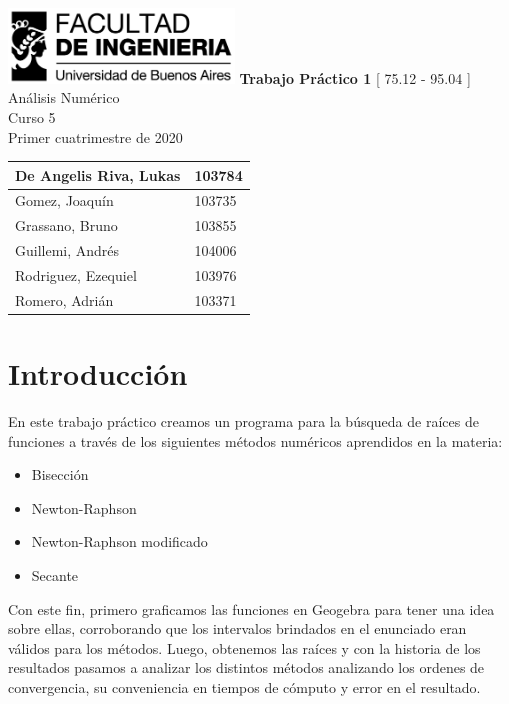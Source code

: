 \documentclass[titlepage,a4paper]{article}
\begin{document}
\begin{titlepage} %
	\hfill\includegraphics[width=6cm]{logofiuba.jpg}
    \centering
    \vfill
    \Huge \textbf{Trabajo Práctico 1}
    \vskip2cm
    \Large [ 75.12 - 95.04 ] Análisis Numérico\\
    Curso 5 \\ 
    Primer cuatrimestre de 2020\\
    \vfill
    \begin{tabular}{ | l | l | } %
      \hline
        De Angelis Riva, Lukas & 103784 \\ \hline
        Gomez, Joaquín & 103735 \\ \hline
        Grassano, Bruno & 103855 \\ \hline
        Guillemi, Andrés & 104006\\ \hline 
        Rodriguez, Ezequiel & 103976 \\ \hline
        Romero, Adrián & 103371 \\ \hline
  	\end{tabular}
    \vfill
    \vfill
    \vfill
\end{titlepage}

\tableofcontents %
\newpage

\section{Introducción}\label{sec:intro}
En este trabajo práctico creamos un programa para la búsqueda de raíces de funciones a través de los siguientes métodos numéricos aprendidos en la materia:
\begin{itemize}
    \item Bisección
    \item Newton-Raphson
    \item Newton-Raphson modificado
    \item Secante
\end{itemize}


Con este fin, primero graficamos las funciones en Geogebra para tener una idea sobre ellas, corroborando que los intervalos brindados en el enunciado eran válidos para los métodos. Luego, obtenemos las raíces y con la historia de los resultados pasamos a analizar los distintos métodos analizando los ordenes de convergencia, su conveniencia en tiempos de cómputo y error en el resultado.
\end{document}
